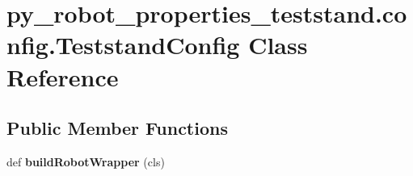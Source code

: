 \hypertarget{classpy__robot__properties__teststand_1_1config_1_1TeststandConfig}{}\section{py\+\_\+robot\+\_\+properties\+\_\+teststand.\+config.\+Teststand\+Config Class Reference}
\label{classpy__robot__properties__teststand_1_1config_1_1TeststandConfig}
\subsection*{Public Member Functions}
\begin{DoxyCompactItemize}
\item 
def {\bfseries build\+Robot\+Wrapper} (cls)\hypertarget{classpy__robot__properties__teststand_1_1config_1_1TeststandConfig_ad0bd7dd74ddf8ca9f8a4c8523f560e6e}{}\label{classpy__robot__properties__teststand_1_1config_1_1TeststandConfig_ad0bd7dd74ddf8ca9f8a4c8523f560e6e}

\end{DoxyCompactItemize}

